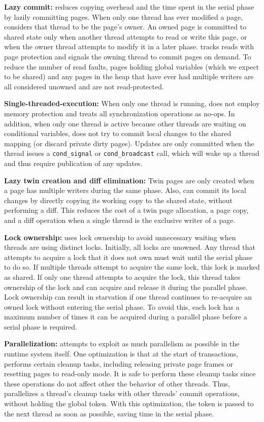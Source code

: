 \textbf{Lazy commit:} \dthreads{} reduces copying overhead and the time spent in the serial phase by lazily committing pages. When only one thread has ever modified a page, \dthreads{} considers that thread to be the page’s owner. An owned page is committed to shared state only when another thread attempts to read or write this page, or when the owner thread attempts to modify it in a later phase. \dthreads{} tracks reads with page protection and signals the owning thread to commit pages on demand. To reduce the number of read faults, pages holding global variables (which we expect to be shared) and any pages in the heap that have ever had multiple writers are all considered unowned and are not read-protected.

\textbf{Single-threaded-execution: }
When only one thread is running, \dthreads{} does not employ memory protection and treats all synchronization operations as no-ops. In addition, when only one thread is active because other threads are waiting on conditional variables, 
\dthreads{} does not try to commit local changes to the shared mapping (or discard private dirty pages). Updates are only committed when the thread issues a \texttt{cond\_signal} or \texttt{cond\_broadcast} call, which will wake up a thread and thus require publication of any updates.

\textbf{Lazy twin creation and diff elimination: }
Twin pages are only created when a page has multiple writers during the same phase. Also, \dthreads{} can commit its local changes by directly copying its working copy to the shared state, without performing a diff. This reduces the cost of a twin page allocation, a page copy, and a diff operation when a single thread is the exclusive writer of a page.

\textbf{Lock ownership:} \dthreads{} uses lock ownership to avoid unnecessary waiting when threads are using distinct locks. Initially, all locks are unowned. Any thread that attempts to acquire a lock that it does not own must wait until the serial phase to do so. If multiple threads attempt to acquire the same lock, this lock is marked as shared. If only one thread attempts to acquire the lock, this thread takes ownership of the lock and can acquire and release
it during the parallel phase. Lock ownership can result in starvation if one thread continues to re-acquire an owned lock without entering the serial phase. To avoid this, each lock has a maximum number of times it can be acquired during a parallel phase before a serial phase is required.

\textbf{Parallelization: }
\dthreads{} attempts to exploit as much parallelism as possible in the runtime system itself. One optimization is that at the start of transactions, \dthreads{} performs certain cleanup tasks, including releasing private page frames or resetting pages to read-only mode. It is safe to perform these cleanup tasks since these operations do not affect other the behavior of other threads.
Thus, \dthreads{} parallelizes a thread's cleanup tasks with other threads’ commit operations, without holding the global token. With this optimization, the token is passed to the next thread as soon as possible, saving time in the serial phase. 